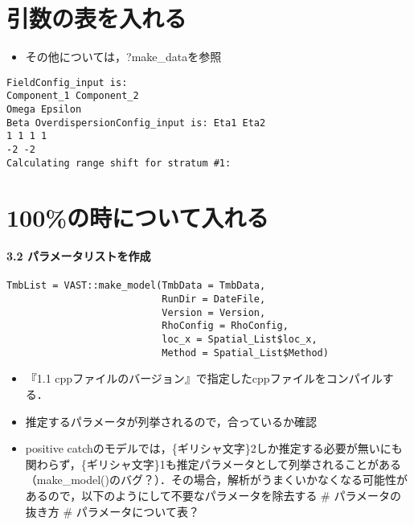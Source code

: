 \documentclass[]{article}
\providecommand{\tightlist}{%
  \setlength{\itemsep}{0pt}\setlength{\parskip}{0pt}}
\let\oldparagraph\paragraph
\renewcommand{\paragraph}[1]{\oldparagraph{#1}\mbox{}}
\begin{document}
\hypertarget{ux5f15ux6570ux306eux8868ux3092ux5165ux308cux308b}{%
\section{引数の表を入れる}\label{ux5f15ux6570ux306eux8868ux3092ux5165ux308cux308b}}

\begin{itemize}
\tightlist
\item
  その他については，?make\_dataを参照
\end{itemize}

\begin{verbatim}
FieldConfig_input is:  
Component_1 Component_2  
Omega Epsilon
Beta OverdispersionConfig_input is: Eta1 Eta2
1 1 1 1
-2 -2
Calculating range shift for stratum #1:
\end{verbatim}

\hypertarget{ux306eux6642ux306bux3064ux3044ux3066ux5165ux308cux308b}{%
\section{100\%の時について入れる}\label{ux306eux6642ux306bux3064ux3044ux3066ux5165ux308cux308b}}

\hypertarget{ux30d1ux30e9ux30e1ux30fcux30bfux30eaux30b9ux30c8ux3092ux4f5cux6210}{%
\paragraph{3.2
パラメータリストを作成}\label{ux30d1ux30e9ux30e1ux30fcux30bfux30eaux30b9ux30c8ux3092ux4f5cux6210}}

\begin{verbatim}
TmbList = VAST::make_model(TmbData = TmbData,
                           RunDir = DateFile,
                           Version = Version,
                           RhoConfig = RhoConfig,
                           loc_x = Spatial_List$loc_x,
                           Method = Spatial_List$Method)
\end{verbatim}

\begin{itemize}
\tightlist
\item
  『1.1 cppファイルのバージョン』で指定したcppファイルをコンパイルする．
\item
  推定するパラメータが列挙されるので，合っているか確認
\item
  positive
  catchのモデルでは，\{ギリシャ文字\}2しか推定する必要が無いにも関わらず，\{ギリシャ文字\}1も推定パラメータとして列挙されることがある（make\_model()のバグ？）．その場合，解析がうまくいかなくなる可能性があるので，以下のようにして不要なパラメータを除去する
  \# パラメータの抜き方 \# パラメータについて表？ 
\end{itemize}
\end{document}
